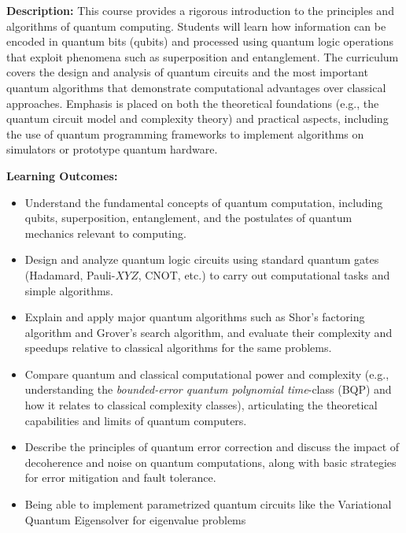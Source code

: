 \documentclass{scrreprt}
\begin{document}
\textbf{Description:} This course provides a rigorous introduction to the principles and algorithms of quantum computing. Students will learn how information can be encoded in quantum bits (qubits) and processed using quantum logic operations that exploit phenomena such as superposition and entanglement. The curriculum covers the design and analysis of quantum circuits and the most important quantum algorithms that demonstrate computational advantages over classical approaches. Emphasis is placed on both the theoretical foundations (e.g., the quantum circuit model and complexity theory) and practical aspects, including the use of quantum programming frameworks to implement algorithms on simulators or prototype quantum hardware.

\textbf{Learning Outcomes:}
\begin{itemize}
\item Understand the fundamental concepts of quantum computation, including qubits, superposition, entanglement, and the postulates of quantum mechanics relevant to computing.
\item Design and analyze quantum logic circuits using standard quantum gates (Hadamard, Pauli-$XYZ$, CNOT, etc.) to carry out computational tasks and simple algorithms. 
\item Explain and apply major quantum algorithms such as Shor’s factoring algorithm and Grover’s search algorithm, and evaluate their complexity and speedups relative to classical algorithms for the same problems.
\item Compare quantum and classical computational power and complexity (e.g., understanding the \textit{bounded-error quantum polynomial time}-class (BQP) and how it relates to classical complexity classes), articulating the theoretical capabilities and limits of quantum computers.
\item Describe the principles of quantum error correction and discuss the impact of decoherence and noise on quantum computations, along with basic 
strategies for error mitigation and fault tolerance.
\item Being able to implement parametrized quantum circuits like the Variational Quantum Eigensolver for eigenvalue problems
\end{itemize}
\end{document}
